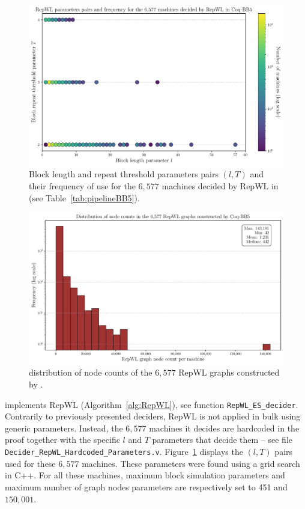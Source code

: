 \begin{figure}
    \centering
    \includegraphics[scale=0.6]{figures/RepWL/repwl_parameters_pairs_log_scale.pdf}
    \caption{Block length and repeat threshold parameters pairs $(l,T)$ and their frequency of use for the ${6,577}$ machines decided by RepWL in \CoqBB (see Table~\ref{tab:pipelineBB5}).}\label{fig:RepWLpairs}
\end{figure}


\begin{figure}
    \centering
    \includegraphics[scale=0.6]{figures/RepWL/repwl_node_counts_histogram.pdf}
    \caption{distribution of node counts of the ${6,577}$ RepWL graphs constructed by \CoqBB.}\label{fig:RepWLhisto}
\end{figure}


\CoqBB implements RepWL (Algorithm~\ref{alg:RepWL}), see function \texttt{RepWL\_ES\_decider}. Contrarily to previously presented deciders, RepWL is not applied in bulk using generic parameters. Instead, the ${6,577}$ machines it decides are hardcoded in the proof together with the specific $l$ and $T$ parameters that decide them -- see file \texttt{Decider\_RepWL\_Hardcoded\_Parameters.v}. Figure~\ref{fig:RepWLpairs} displays the $(l,T)$ pairs used for these ${6,577}$ machines. These parameters were found using a grid search in C++. For all these machines, maximum block simulation parameters and maximum number of graph nodes parameters are respectively set to 451 and ${150,001}$.

